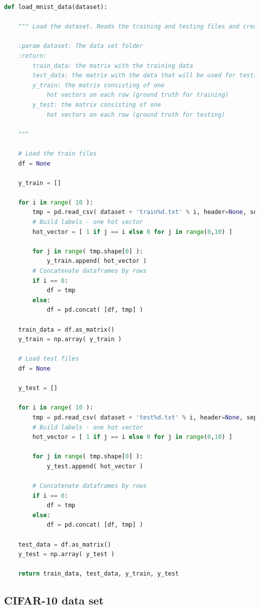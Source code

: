 \documentclass[11pt]{article}
\begin{document}
\begin{lstlisting}[language = Python]
def load_mnist_data(dataset):
    
    """ Load the dataset. Reads the training and testing files and creates matrices.
    
    :param dataset: The data set folder 
    :return:
        train_data: the matrix with the training data
        test_data: the matrix with the data that will be used for testing
        y_train: the matrix consisting of one 
            hot vectors on each row (ground truth for training)
        y_test: the matrix consisting of one
            hot vectors on each row (ground truth for testing)    
            
    """
    
    # Load the train files
    df = None
    
    y_train = []

    for i in range( 10 ):
        tmp = pd.read_csv( dataset + 'train%d.txt' % i, header=None, sep=" " )
        # Build labels - one hot vector
        hot_vector = [ 1 if j == i else 0 for j in range(0,10) ]
        
        for j in range( tmp.shape[0] ):
            y_train.append( hot_vector )
        # Concatenate dataframes by rows    
        if i == 0:
            df = tmp
        else:
            df = pd.concat( [df, tmp] )

    train_data = df.as_matrix()
    y_train = np.array( y_train )
    
    # Load test files
    df = None
    
    y_test = []

    for i in range( 10 ):
        tmp = pd.read_csv( dataset + 'test%d.txt' % i, header=None, sep=" " )
        # Build labels - one hot vector
        hot_vector = [ 1 if j == i else 0 for j in range(0,10) ]
        
        for j in range( tmp.shape[0] ):
            y_test.append( hot_vector )
            
        # Concatenate dataframes by rows    
        if i == 0:
            df = tmp
        else:
            df = pd.concat( [df, tmp] )

    test_data = df.as_matrix()
    y_test = np.array( y_test )
    
    return train_data, test_data, y_train, y_test
\end{lstlisting}

\subsection{CIFAR-10 data set}
\end{document}
